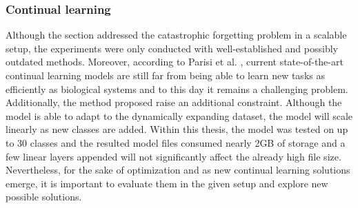 \subsubsection{Continual learning}
Although the  section addressed the catastrophic forgetting problem in a scalable setup, the experiments were only conducted with well-established and possibly outdated methods. Moreover, according to Parisi et al. \cite{Parisi2018}, current state-of-the-art continual learning models are still far from being able to learn new tasks as efficiently as biological systems and to this day it remains a challenging problem. Additionally, the method proposed raise an additional constraint. Although the model is able to adapt to the dynamically expanding dataset, the model will scale linearly as new classes are added. Within this thesis, the model was tested on up to 30 classes and the resulted model files consumed nearly 2GB of storage and a few linear layers appended will not significantly affect the already high file size. Nevertheless, for the sake of optimization and as new continual learning solutions emerge, it is important to evaluate them in the given setup and explore new possible solutions. 




\clearpage